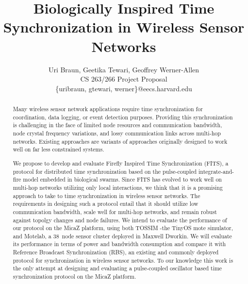 \documentclass[8pt,twocolumn]{article}
\begin{document}
\title{Biologically Inspired Time Synchronization in Wireless Sensor Networks}
\author{ Uri Braun, Geetika Tewari, Geoffrey Werner-Allen\\ 
CS 263/266 Project Proposal\\
\{uribraun, gtewari, werner\}@eecs.harvard.edu }
\maketitle

\begin{abstract} 

Many wireless sensor network applications require time
synchronization for coordination, data logging, or event detection
purposes.
Providing this synchronization is challenging in the face of limited node
resources and communication bandwidth, node crystal frequency variations, and
lossy communication links across multi-hop networks.
Existing approaches are variants of approaches originally designed to work
well on far less constrained systems.

We propose to develop and evaluate Firefly
Inspired Time Synchronization (FITS), a protocol for distributed time
synchronization based on the pulse-coupled integrate-and-fire model
embedded in biological swarms.  Since FITS has evolved to work well on
multi-hop networks utilizing only local interactions, we think that it is a
promising approach to take to time synchronization in wireless sensor
networks. 
The requirements in designing such a protocol entail
that it should utilize low communication bandwidth, scale well for multi-hop
networks, and remain robust against topolgy changes and node failures.  We
intend to evaluate the performance of our protocol on the MicaZ
platform, using both TOSSIM -the TinyOS mote simulator, and Motelab, a
38~node sensor cluster deployed in Maxwell Dworkin.  We will evaluate its
performance in terms of power and bandwidth consumption and compare it with
Reference Broadcast Synchronization (RBS), an existing and commonly deployed
protocol for synchronization in wireless sensor networks.
To our knowledge this work is the only attempt at designing and
evaluating a pulse-coupled oscillator based time synchronization
protocol on the MicaZ platform.  \end{abstract}
\end{document}
